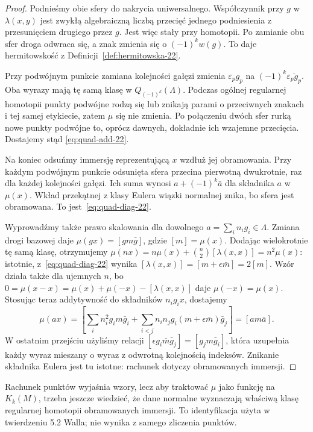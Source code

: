 \begin{proof}
Podnieśmy obie sfery do nakrycia uniwersalnego.
Współczynnik przy $g$ w $\lambda(x,y)$ jest
zwykłą algebraiczną liczbą przecięć jednego
podniesienia z przesunięciem drugiego przez $g$.
Jest więc stały przy homotopii. Po zamianie
obu sfer droga odwraca się, a znak zmienia się
o $(-1)^k w(g)$. To daje hermitowskość z
Definicji~\ref{def:hermitowska-22}.

Przy podwójnym punkcie zamiana kolejności
gałęzi zmienia $\varepsilon_p g_p$ na
$(-1)^k\overline{\varepsilon_p g_p}$.
Oba wyrazy mają tę samą klasę w
$Q_{(-1)^k}(\Lambda)$. Podczas ogólnej regularnej
homotopii punkty podwójne rodzą się lub znikają
parami o przeciwnych znakach i tej samej
etykiecie, zatem $\mu$ się nie zmienia.
Po połączeniu dwóch sfer rurką nowe punkty
podwójne to, oprócz dawnych, dokładnie ich
wzajemne przecięcia. Dostajemy stąd
\eqref{eq:quad-add-22}.

Na koniec odsuńmy immersję reprezentującą $x$
wzdłuż jej obramowania. Przy każdym podwójnym
punkcie odsunięta sfera przecina pierwotną
dwukrotnie, raz dla każdej kolejności gałęzi.
Ich suma wynosi $a+(-1)^k\bar a$ dla składnika
$a$ w $\mu(x)$. Wkład przekątnej z klasy Eulera
wiązki normalnej znika, bo sfera jest obramowana.
To jest~\eqref{eq:quad-diag-22}.

Wyprowadźmy także prawo skalowania dla dowolnego
$a=\sum_i n_i g_i\in\Lambda$. Zmiana drogi bazowej daje
$\mu(gx)=[g m\bar g]$, gdzie $[m]=\mu(x)$.
Dodając wielokrotnie tę samą klasę, otrzymujemy
$\mu(nx)=n\mu(x)+\binom n2[\lambda(x,x)]=n^2\mu(x)$:
istotnie, z~\eqref{eq:quad-diag-22} wynika
$[\lambda(x,x)]=[m+\epsilon\bar m]=2[m]$.
Wzór działa także dla ujemnych $n$, bo
$0=\mu(x-x)=\mu(x)+\mu(-x)-[\lambda(x,x)]$
daje $\mu(-x)=\mu(x)$. Stosując teraz addytywność
do składników $n_i g_i x$, dostajemy
\[
 \mu(ax)=\left[\sum_i n_i^2g_i m\bar g_i
   +\sum_{i<j}n_i n_jg_i(m+\epsilon\bar m)\bar g_j\right]
       =[a m\bar a].
\]
W ostatnim przejściu użyliśmy relacji
$[\epsilon g_i\bar m\bar g_j]=[g_jm\bar g_i]$,
która uzupełnia każdy wyraz mieszany o wyraz
z odwrotną kolejnością indeksów. Znikanie składnika
Eulera jest tu istotne: rachunek dotyczy obramowanych immersji.
\end{proof}

Rachunek punktów wyjaśnia wzory, lecz aby
traktować $\mu$ jako funkcję na $K_k(M)$,
trzeba jeszcze wiedzieć, że dane normalne
wyznaczają właściwą klasę regularnej homotopii
obramowanych immersji. To identyfikacja
użyta w twierdzeniu 5.2 Walla; nie wynika
z samego zliczenia punktów.

